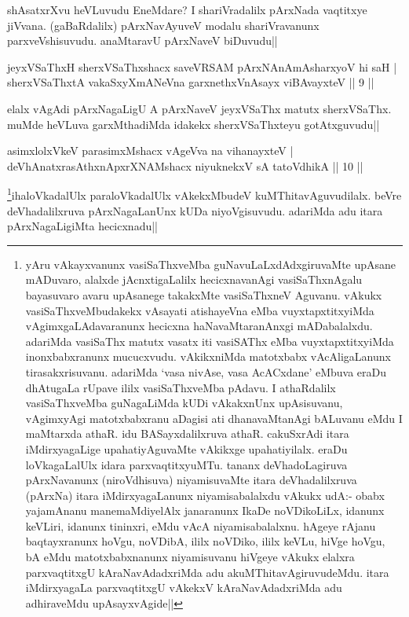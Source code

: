 \begin{artha} 
shAsatxrXvu heVLuvudu EneMdare? I shariVradalilx pArxNada vaqtitxye 
jiVvana. (gaBaRdalilx) pArxNavAyuveV modalu shariVravanunx 
parxveVshisuvudu. anaMtaravU pArxNaveV biDuvudu||
\end{artha}

\begin{shl}
jeyxVSaThxH sherxVSaThxshacx saveVRSAM pArxNAnAmAsharxyoV hi saH | \\
sherxVSaThxtA vakaSxyXmANeVna garxnethxVnAsayx viBAvayxteV \hfill|| 9 || 
\end{shl}

\begin{artha} 
elalx vAgAdi pArxNagaLigU A pArxNaveV jeyxVSaThx matutx sherxVSaThx. 
muMde heVLuva garxMthadiMda idakekx sherxVSaThxteyu gotAtxguvudu||
\end{artha}


\begin{shl}
asimxlolxVkeV parasimxMshacx vAgeVva na vihanayxteV | \\
deVhAnatxrasAthxnApxrXNAMshacx niyuknekxV sA tatoV\s dhikA \hfill|| 10 || 
\end{shl}

\begin{artha} 
\footnote[1]{yAru vAkayxvanunx vasiSaThxveMba guNavuLaLxdAdxgiruvaMte 
upAsane mADuvaro, alalxde jAcnxtigaLalilx hecicxnavanAgi 
vasiSaThxnAgalu bayasuvaro avaru upAsanege takakxMte vasiSaThxneV 
Aguvanu. vAkukx vasiSaThxveMbudakekx vAsayati atishayeVna eMba 
vuyxtapxtitxyiMda vAgimxgaLAdavaranunx hecicxna haNavaMtaranAnxgi 
mADabalalxdu. adariMda vasiSaThx matutx vasatx iti vasiSAThx eMba 
vuyxtapxtitxyiMda inonxbabxranunx mucucxvudu. vAkikxniMda matotxbabx 
vAcAligaLanunx tirasakxrisuvanu. adariMda `vasa nivAse, vasa 
AcACxdane' eMbuva eraDu dhAtugaLa rUpave ililx vasiSaThxveMba pAdavu. 
I athaRdalilx vasiSaThxveMba guNagaLiMda kUDi vAkakxnUnx upAsisuvanu, 
vAgimxyAgi matotxbabxranu aDagisi ati dhanavaMtanAgi bALuvanu eMdu I 
maMtarxda athaR. idu BASayxdalilxruva athaR. cakuSxrAdi itara 
iMdirxyagaLige upahatiyAguvaMte vAkikxge upahatiyilalx. eraDu 
loVkagaLalUlx idara parxvaqtitxyuMTu. tananx deVhadoLagiruva 
pArxNavanunx (niroVdhisuva) niyamisuvaMte itara deVhadalilxruva 
(pArxNa) itara iMdirxyagaLanunx niyamisabalalxdu vAkukx udA:- obabx 
yajamAnanu manemaMdiyelAlx janaranunx IkaDe noVDikoLiLx, idanunx 
keVLiri, idanunx tininxri, eMdu vAcA niyamisabalalxnu. hAgeye rAjanu 
baqtayxranunx hoVgu, noVDibA, ililx noVDiko, ililx keVLu, hiVge hoVgu, 
bA eMdu matotxbabxnanunx niyamisuvanu hiVgeye vAkukx elalxra 
parxvaqtitxgU kAraNavAdadxriMda adu akuMThitavAgiruvudeMdu. itara 
iMdirxyagaLa parxvaqtitxgU vAkekxV kAraNavAdadxriMda adu adhiraveMdu 
upAsayxvAgide||}ihaloVkadalUlx paraloVkadalUlx vAkekxMbudeV kuMThitavAguvudilalx. 
beVre deVhadalilxruva pArxNagaLanUnx kUDa niyoVgisuvudu. adariMda adu 
itara pArxNagaLigiMta hecicxnadu||
\end{artha}


